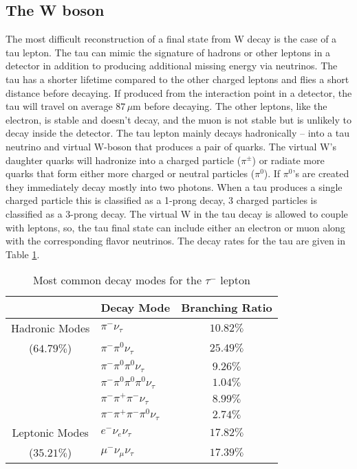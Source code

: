 
\subsection{The W boson}
\label{subsec:std_model}



  The most difficult reconstruction of a final state from W decay is the case of a tau lepton. The tau can mimic the signature of hadrons or other leptons in a detector in addition to producing additional missing energy via neutrinos. The tau has a shorter lifetime compared to the other charged leptons and flies a short distance before decaying. If produced from the interaction point in a detector, the tau will travel on average $87\,\mu\text{m}$ before decaying. The other leptons, like the electron, is stable and doesn't decay, and the muon is not stable but is unlikely to decay inside the detector. The tau lepton mainly decays hadronically -- into a tau neutrino and virtual W-boson that produces a pair of quarks. The virtual W's daughter quarks will hadronize into a charged particle ($\pi^\pm$) or radiate more quarks that form either more charged or neutral particles ($\pi^0$). If $\pi^0$'s are created they immediately decay mostly into two photons. When a tau produces a single charged particle this is classified as a 1-prong decay, 3 charged particles is classified as a 3-prong decay. The virtual W in the tau decay is allowed to couple with leptons, so, the tau final state can include either an electron or muon along with the corresponding flavor neutrinos. The decay rates for the tau are given in Table \ref{tab:taudecay}.

\begin{table}
\centering
 \begin{tabular}{|c|l|c|} 
 
 \hline
       & Decay Mode & Branching Ratio  \\ \hline \hline
    Hadronic Modes  & $\pi^- \nu_\tau$  & $10.82\%$  \\
      	($64.79\%$) & $\pi^- \pi^0 \nu_\tau$ & $25.49\%$ \\
     				& $\pi^- \pi^0 \pi^0 \nu_\tau$  & $9.26\%$  \\
     				& $\pi^- \pi^0 \pi^0 \pi^0 \nu_\tau$  & $1.04\%$   \\
      				& $\pi^- \pi^+ \pi^- \nu_\tau$  & $8.99\%$      \\ 
      				& $\pi^- \pi^+ \pi^- \pi^0 \nu_\tau$  & $2.74\%$  \\ \hline
    			    
    Leptonic Modes  & $e^- \nu_e \nu_\tau$ & $17.82\%$   \\
    	($35.21\%$)	& $\mu^- \nu_\mu \nu_\tau $  & $17.39\%$      \\ \midrule \hline
      				
     				
\end{tabular}
        \caption{\label{tab:taudecay}Most common decay modes for the $\tau^-$ lepton \cite{pdg}}
\end{table}
       
